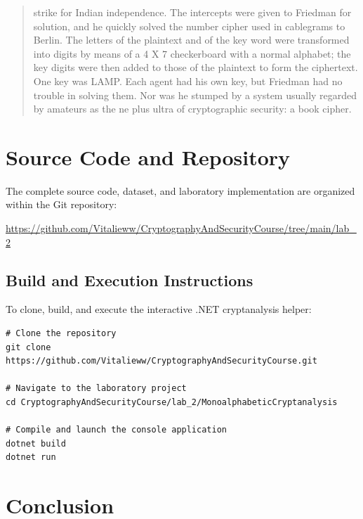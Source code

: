 \documentclass[12pt,a4paper]{article}
\begin{document}
\begin{quote}
strike for Indian independence. The intercepts were given to Friedman for solution, and he quickly solved the number cipher used in cablegrams to Berlin. The letters of the plaintext and of the key word were transformed into digits by means of a 4 X 7 checkerboard with a normal alphabet; the key digits were then added to those of the plaintext to form the ciphertext. One key was LAMP. Each agent had his own key, but Friedman had no trouble in solving them. Nor was he stumped by a system usually regarded by amateurs as the ne plus ultra of cryptographic security: a book cipher.
\end{quote}

\section{Source Code and Repository}

The complete source code, dataset, and laboratory implementation are organized within the Git repository:
\begin{center}
    \large
    \url{https://github.com/Vitalieww/CryptographyAndSecurityCourse/tree/main/lab_2}
\end{center}

\subsection{Build and Execution Instructions}
To clone, build, and execute the interactive .NET cryptanalysis helper:
\begin{lstlisting}[numbers=none,basicstyle=\small\ttfamily]
# Clone the repository
git clone https://github.com/Vitalieww/CryptographyAndSecurityCourse.git

# Navigate to the laboratory project
cd CryptographyAndSecurityCourse/lab_2/MonoalphabeticCryptanalysis

# Compile and launch the console application
dotnet build
dotnet run
\end{lstlisting}

\section{Conclusion}
\end{document}
